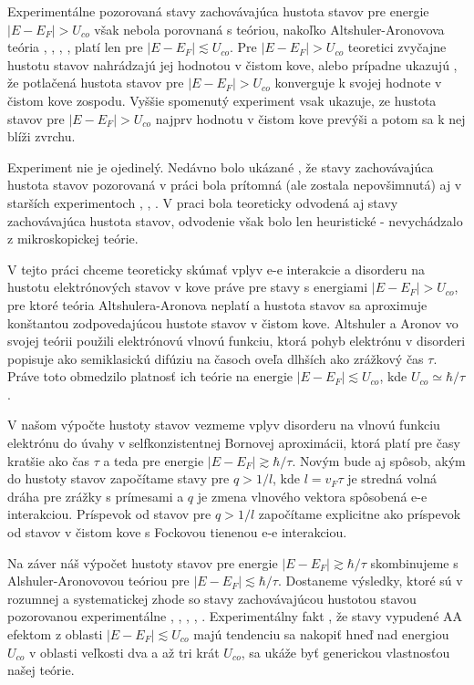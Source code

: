 Experimentálne pozorovaná \cite{Mazur} stavy zachovávajúca hustota stavov pre energie $|E-E_F| > U_{co}$  však nebola porovnaná s teóriou, nakoľko Altshuler-Aronovova teória  \cite{Altshuler1}, \cite{Altshuler3}, \cite{Altshuler4},  \cite{LeeRamakrishnan}, \cite{Imry} platí len pre $|E-E_F| \lesssim U_{co}$. Pre $|E-E_F| > U_{co}$ teoretici \cite{Hlubina} zvyčajne hustotu stavov nahrádzajú jej hodnotou v čistom kove, alebo prípadne ukazujú \cite{Rabatin}, že potlačená hustota stavov pre
$|E-E_F| > U_{co}$ konverguje k svojej hodnote v čistom kove zospodu. Vyššie spomenutý experiment \cite{Mazur} vsak ukazuje, ze hustota stavov pre $|E-E_F| > U_{co}$ najprv hodnotu v čistom kove
prevýši a potom sa k nej blíži zvrchu. 

Experiment \cite{Mazur} nie je ojedinelý. 
Nedávno bolo ukázané \cite{Moskova}, že stavy zachovávajúca hustota stavov pozorovaná v práci \cite{Mazur} bola prítomná (ale zostala nepovšimnutá) aj v starších experimentoch \cite{Schmitz1}, \cite{Schmitz2}, \cite{Escudero}. V praci \cite{Moskova} bola teoreticky odvodená aj stavy zachovávajúca hustota stavov, odvodenie však bolo len heuristické - nevychádzalo z mikroskopickej teórie.

V tejto práci chceme teoreticky skúmať vplyv e-e interakcie a disorderu na
hustotu elektrónových stavov v kove práve pre stavy s energiami $|E-E_F| > U_{co}$, pre ktoré teória Altshulera-Aronova neplatí a hustota stavov sa aproximuje konštantou zodpovedajúcou hustote stavov v čistom kove. Altshuler a Aronov vo svojej teórii použili elektrónovú vlnovú funkciu, ktorá pohyb elektrónu v disorderi popisuje ako semiklasickú difúziu na časoch oveľa dlhších ako zrážkový čas $\tau$. Práve toto  obmedzilo platnosť ich teórie na energie $|E-E_F| \lesssim U_{co}$, kde $U_{co} \simeq \hbar/\tau$.
 
 V našom výpočte hustoty stavov vezmeme vplyv disorderu na vlnovú funkciu elektrónu do úvahy v selfkonzistentnej Bornovej aproximácii, ktorá platí pre časy kratšie ako čas $\tau$ a teda pre energie $|E-E_F|  \gtrsim \hbar/\tau$. Novým bude aj spôsob, akým do hustoty stavov započítame stavy pre $q > 1/l$, kde $l = v_F \tau$ je stredná volná dráha pre zrážky s prímesami a $q$ je zmena vlnového vektora spôsobená e-e interakciou. Príspevok od stavov pre $q > 1/l$  započítame
 explicitne ako príspevok od stavov v čistom kove s Fockovou tienenou e-e interakciou. 
 
  Na záver náš výpočet hustoty stavov pre energie $|E-E_F|  \gtrsim \hbar/\tau$ skombinujeme s Alshuler-Aronovovou teóriou pre $|E-E_F|  \lesssim \hbar/\tau$. Dostaneme výsledky, ktoré sú v rozumnej a systematickej zhode so stavy zachovávajúcou hustotou stavou pozorovanou experimentálne \cite{Mazur}, \cite{Schmitz1}, \cite{Schmitz2}, \cite{Escudero}, \cite{Moskova}. Experimentálny fakt \cite{Mazur}, že stavy vypudené AA efektom z oblasti $|E-E_F| \lesssim U_{co}$ majú tendenciu sa nakopiť hneď nad energiou $U_{co}$ v oblasti veľkosti dva a až tri krát $U_{co}$, sa ukáže byť generickou vlastnosťou našej teórie.


